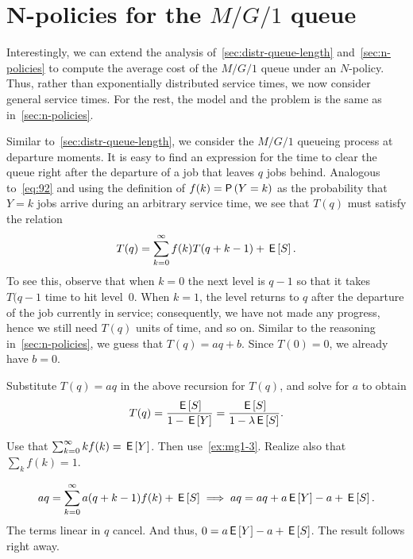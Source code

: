 \section{N-policies for the $M/G/1$ queue}
\label{sec:n-policies-mg1}

Interestingly, we can extend the analysis of~\cref{sec:distr-queue-length} and~\cref{sec:n-policies} to compute the average cost of the $M/G/1$ queue under an $N$-policy.
Thus, rather than exponentially distributed service times, we now consider general service times.
For the rest, the model and the problem is the same as in~\cref{sec:n-policies}. 



Similar to~\cref{sec:distr-queue-length}, we consider the $M/G/1$ queueing process at departure moments.
It is easy to find an expression for the time to clear the queue right after the departure of a job that leaves $q$ jobs behind.
Analogous to~\cref{eq:92} and using the definition of $f(k)=\P{Y=k}$ as the probability that $Y=k$ jobs arrive during an arbitrary service time, we see that $T(q)$ must satisfy the relation
\begin{equation*}
  T(q) = \sum_{k=0}^\infty f(k) T(q+k-1) + \,\mathsf{E}\left[S\right].
\end{equation*}
To see this, observe that when $k=0$ the next level is $q-1$ so that it takes $T(q-1$ time to hit level~$0$.
When $k=1$, the level returns to $q$ after the departure of the job currently in service; consequently, we have not made any progress, hence we still need $T(q)$ units of time,  and so on.
Similar to the reasoning in~\cref{sec:n-policies}, we guess that $T(q) = a q + b$. Since $T(0)=0$, we already have $b=0$. 

\begin{exercise}
Substitute $T(q) = a q$ in the above recursion for $T(q)$, and solve for $a$ to obtain
\begin{equation*}
  T(q) = \frac{\,\mathsf{E}\left[S\right]}{1- \,\mathsf{E}\left[Y\right]} = \frac{\,\mathsf{E}\left[S\right]}{1-\lambda \,\mathsf{E}\left[S\right]}.
\end{equation*}
\begin{hint}
  Use that $\sum_{k=0}^\infty k f(k) = \,\mathsf{E}\left[Y\right]$. Then use~\cref{ex:mg1-3}. Realize also that $\sum_k f(k) = 1$. 
\end{hint}
\begin{solution}
  \begin{align*}
    a q = \sum_{k=0}^\infty a (q+k-1) f(k) + \,\mathsf{E}\left[S\right] \implies a q = a q + a \,\mathsf{E}\left[Y\right] - a + \,\mathsf{E}\left[S\right].
  \end{align*}
The terms linear in $q$ cancel. And thus, $0=a\,\mathsf{E}\left[Y\right] - a + \,\mathsf{E}\left[S\right]$. The result follows right away.
\end{solution}
\end{exercise}

